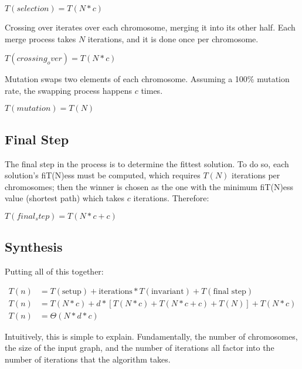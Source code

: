 $T(selection) =  T(N * c)$

Crossing over iterates over each chromosome, merging it into its other half. Each merge process takes $N$ iterations, and it is done once per chromosome.

$T(crossing_over) = T(N * c)$

Mutation swaps two elements of each chromosome. Assuming a 100\% mutation rate, the swapping process happens $c$ times.

$T(mutation) = T(N)$

\subsection{Final Step}

The final step in the process is to determine the fittest solution. To do so, each solution's fiT(N)ess must be computed, which requires $T(N)$ iterations per chromosomes; then the winner is chosen as the one with the minimum fiT(N)ess value (shortest path) which takes $c$ iterations. Therefore:

$T(final_step) = T(N*c + c) $ 

\subsection{Synthesis}

Putting all of this together:

\begin{equation}
\begin{split}
T(n) &= T(\textrm{setup}) + \textrm{iterations} * T(\textrm{invariant}) + T(\textrm{final step}) \\
T(n) &= T(N * c) + d * [T(N * c) + T(N * c + c) + T(N) ] + T(N*c) \\
T(n) &= \Theta(N * d * c)
\end{split}
\end{equation}

Intuitively, this is simple to explain. Fundamentally, the number of chromosomes, the size of the input graph, and the number of iterations all factor into the number of iterations that the algorithm takes.
